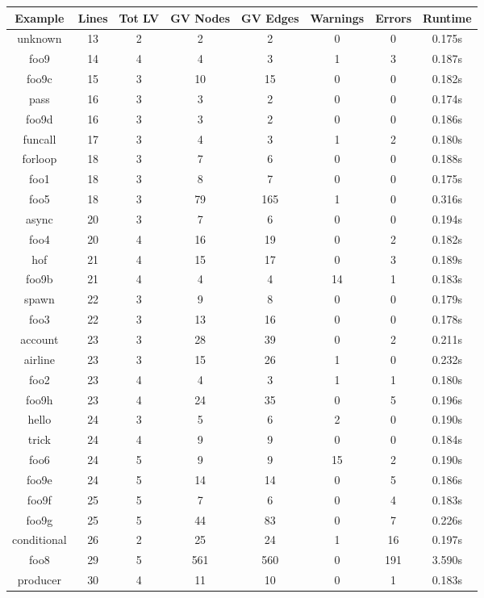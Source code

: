 \begin{table}[!ht]
\centering
\begin{tabular}{|c|c|c|c|c|c|c|c|}
\hline
Example & Lines & Tot LV & GV Nodes & GV Edges & Warnings & Errors & Runtime \\ 
\hline
unknown & 13 & 2 & 2 & 2 & 0 & 0 & 0.175s \\ 
foo9 & 14 & 4 & 4 & 3 & 1 & 3 & 0.187s \\ 
foo9c & 15 & 3 & 10 & 15 & 0 & 0 & 0.182s \\ 
pass & 16 & 3 & 3 & 2 & 0 & 0 & 0.174s \\ 
foo9d & 16 & 3 & 3 & 2 & 0 & 0 & 0.186s \\ 
funcall & 17 & 3 & 4 & 3 & 1 & 2 & 0.180s \\ 
forloop & 18 & 3 & 7 & 6 & 0 & 0 & 0.188s \\ 
foo1 & 18 & 3 & 8 & 7 & 0 & 0 & 0.175s \\ 
foo5 & 18 & 3 & 79 & 165 & 1 & 0 & 0.316s \\ 
async & 20 & 3 & 7 & 6 & 0 & 0 & 0.194s \\ 
foo4 & 20 & 4 & 16 & 19 & 0 & 2 & 0.182s \\ 
hof & 21 & 4 & 15 & 17 & 0 & 3 & 0.189s \\ 
foo9b & 21 & 4 & 4 & 4 & 14 & 1 & 0.183s \\ 
spawn & 22 & 3 & 9 & 8 & 0 & 0 & 0.179s \\ 
foo3 & 22 & 3 & 13 & 16 & 0 & 0 & 0.178s \\ 
account & 23 & 3 & 28 & 39 & 0 & 2 & 0.211s \\ 
airline & 23 & 3 & 15 & 26 & 1 & 0 & 0.232s \\ 
foo2 & 23 & 4 & 4 & 3 & 1 & 1 & 0.180s \\ 
foo9h & 23 & 4 & 24 & 35 & 0 & 5 & 0.196s \\ 
hello & 24 & 3 & 5 & 6 & 2 & 0 & 0.190s \\ 
trick & 24 & 4 & 9 & 9 & 0 & 0 & 0.184s \\ 
foo6 & 24 & 5 & 9 & 9 & 15 & 2 & 0.190s \\ 
foo9e & 24 & 5 & 14 & 14 & 0 & 5 & 0.186s \\ 
foo9f & 25 & 5 & 7 & 6 & 0 & 4 & 0.183s \\ 
foo9g & 25 & 5 & 44 & 83 & 0 & 7 & 0.226s \\ 
conditional & 26 & 2 & 25 & 24 & 1 & 16 & 0.197s \\ 
foo8 & 29 & 5 & 561 & 560 & 0 & 191 & 3.590s \\ 
producer & 30 & 4 & 11 & 10 & 0 & 1 & 0.183s \\ 

\end{tabular}
\end{table}

